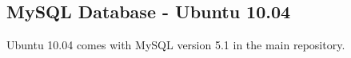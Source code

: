 \subsection{MySQL Database - Ubuntu 10.04}

Ubuntu 10.04 comes with MySQL version 5.1 in the main repository.


